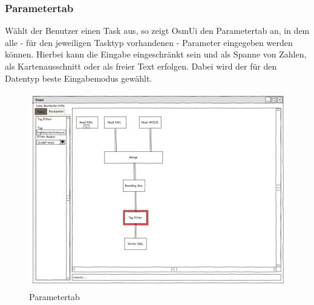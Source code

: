 \documentclass[a4paper,12pt]{scrartcl}
\begin{document}
\subsubsection{Parametertab}
Wählt der Benutzer einen Task aus, so zeigt OsmUi den Parametertab an, in dem alle - für den jeweiligen Tasktyp vorhandenen - Parameter eingegeben werden können.
Hierbei kann die Eingabe eingeschränkt sein und als Spanne von Zahlen, als Kartenausschnitt oder als freier Text erfolgen. Dabei wird der für den Datentyp beste Eingabemodus gewählt.\\
\begin{center}
\begin{figure}[h!]
\includegraphics[width=15cm]{ui_prototype/OsmUi_Parameter_Optionen.png}
\caption{Parametertab}
\end{figure}
\end{center}
\end{document}
